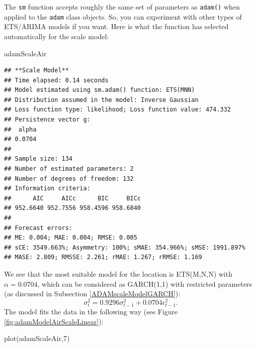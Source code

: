 \documentclass[
]{book}
\newenvironment{Shaded}{\begin{snugshade}}{\end{snugshade}}
\newcommand{\DecValTok}[1]{\textcolor[rgb]{0.00,0.00,0.81}{#1}}
\newcommand{\FunctionTok}[1]{\textcolor[rgb]{0.00,0.00,0.00}{#1}}
\newcommand{\NormalTok}[1]{#1}
\theoremstyle{definition}
\theoremstyle{definition}
\theoremstyle{definition}
\theoremstyle{definition}
\theoremstyle{remark}
\begin{document}
The \texttt{sm} function accepts roughly the same set of parameters as \texttt{adam()} when applied to the \texttt{adam} class objects. So, you can experiment with other types of ETS/ARIMA models if you want. Here is what the function has selected automatically for the scale model:

\begin{Shaded}
\begin{Highlighting}[]
\NormalTok{adamScaleAir}
\end{Highlighting}
\end{Shaded}

\begin{verbatim}
## **Scale Model**
## Time elapsed: 0.14 seconds
## Model estimated using sm.adam() function: ETS(MNN)
## Distribution assumed in the model: Inverse Gaussian
## Loss function type: likelihood; Loss function value: 474.332
## Persistence vector g:
##  alpha 
## 0.0704 
## 
## Sample size: 134
## Number of estimated parameters: 2
## Number of degrees of freedom: 132
## Information criteria:
##      AIC     AICc      BIC     BICc 
## 952.6640 952.7556 958.4596 958.6840 
## 
## Forecast errors:
## ME: 0.004; MAE: 0.004; RMSE: 0.005
## sCE: 3549.663%; Asymmetry: 100%; sMAE: 354.966%; sMSE: 1991.897%
## MASE: 2.809; RMSSE: 2.261; rMAE: 1.267; rRMSE: 1.169
\end{verbatim}

We see that the most suitable model for the location is ETS(M,N,N) with \(\alpha=0.0704\), which can be considered as GARCH(1,1) with restricted parameters (as discussed in Subsection \ref{ADAMscaleModelGARCH}):
\begin{equation*}
    \sigma_t^2 = 0.9296 \sigma_{t-1}^2 + 0.0704 \epsilon_{t-1}^2 .
\end{equation*}
The model fits the data in the following way (see Figure \ref{fig:adamModelAirScaleLinear}):

\begin{Shaded}
\begin{Highlighting}[]
\FunctionTok{plot}\NormalTok{(adamScaleAir,}\DecValTok{7}\NormalTok{)}
\end{Highlighting}
\end{Shaded}
\end{document}
